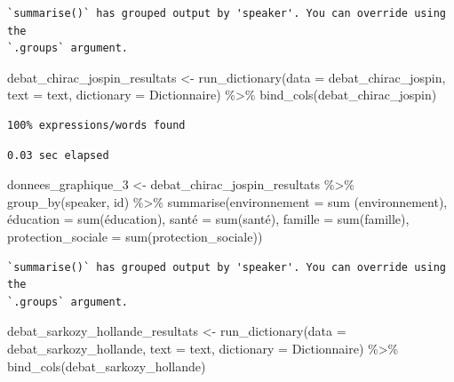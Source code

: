 \documentclass[
  letterpaper,
  DIV=11,
  numbers=noendperiod]{scrartcl}
\newenvironment{Shaded}{\begin{snugshade}}{\end{snugshade}}
\newcommand{\AttributeTok}[1]{\textcolor[rgb]{0.40,0.45,0.13}{#1}}
\newcommand{\FunctionTok}[1]{\textcolor[rgb]{0.28,0.35,0.67}{#1}}
\newcommand{\NormalTok}[1]{\textcolor[rgb]{0.00,0.23,0.31}{#1}}
\newcommand{\OtherTok}[1]{\textcolor[rgb]{0.00,0.23,0.31}{#1}}
\newcommand{\SpecialCharTok}[1]{\textcolor[rgb]{0.37,0.37,0.37}{#1}}
\begin{document}
\begin{verbatim}
`summarise()` has grouped output by 'speaker'. You can override using the
`.groups` argument.
\end{verbatim}

\begin{Shaded}
\begin{Highlighting}[]
\NormalTok{debat\_chirac\_jospin\_resultats }\OtherTok{\textless{}{-}} \FunctionTok{run\_dictionary}\NormalTok{(}\AttributeTok{data =}\NormalTok{ debat\_chirac\_jospin, }\AttributeTok{text =}\NormalTok{ text, }\AttributeTok{dictionary =}\NormalTok{ Dictionnaire) }\SpecialCharTok{\%\textgreater{}\%} \FunctionTok{bind\_cols}\NormalTok{(debat\_chirac\_jospin)}
\end{Highlighting}
\end{Shaded}

\begin{verbatim}
100% expressions/words found
\end{verbatim}

\begin{verbatim}
0.03 sec elapsed
\end{verbatim}

\begin{Shaded}
\begin{Highlighting}[]
\NormalTok{donnees\_graphique\_3 }\OtherTok{\textless{}{-}}\NormalTok{ debat\_chirac\_jospin\_resultats }\SpecialCharTok{\%\textgreater{}\%} \FunctionTok{group\_by}\NormalTok{(speaker, id) }\SpecialCharTok{\%\textgreater{}\%} \FunctionTok{summarise}\NormalTok{(}\AttributeTok{environnement =} \FunctionTok{sum}\NormalTok{ (environnement), é}\AttributeTok{ducation =} \FunctionTok{sum}\NormalTok{(éducation), santé }\OtherTok{=} \FunctionTok{sum}\NormalTok{(santé), }\AttributeTok{famille =} \FunctionTok{sum}\NormalTok{(famille), }\AttributeTok{protection\_sociale =} \FunctionTok{sum}\NormalTok{(protection\_sociale))}
\end{Highlighting}
\end{Shaded}

\begin{verbatim}
`summarise()` has grouped output by 'speaker'. You can override using the
`.groups` argument.
\end{verbatim}

\begin{Shaded}
\begin{Highlighting}[]
\NormalTok{debat\_sarkozy\_hollande\_resultats }\OtherTok{\textless{}{-}} \FunctionTok{run\_dictionary}\NormalTok{(}\AttributeTok{data =}\NormalTok{ debat\_sarkozy\_hollande, }\AttributeTok{text =}\NormalTok{ text, }\AttributeTok{dictionary =}\NormalTok{ Dictionnaire) }\SpecialCharTok{\%\textgreater{}\%} \FunctionTok{bind\_cols}\NormalTok{(debat\_sarkozy\_hollande)}
\end{Highlighting}
\end{Shaded}
\end{document}
